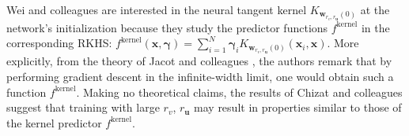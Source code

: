 \documentclass{article}
\begin{document}
Wei and colleagues are interested in the neural tangent kernel $K_{\boldsymbol{w}_{r_v, r_{\boldsymbol{u}}}(0)}$ at the network's initialization because they study the predictor functions $f^{\text{kernel}}$ in the corresponding RKHS: $f^{\text{kernel}}(\boldsymbol{x}, \boldsymbol{\gamma}) = \sum_{i=1}^N \boldsymbol{\gamma}_i K_{\boldsymbol{w}_{r_v, r_{\boldsymbol{u}}}(0)}(\boldsymbol{x}_i, \boldsymbol{x})$. More explicitly, from the theory of Jacot and colleagues \cite{jacot2018neural}, the authors remark that by performing gradient descent in the infinite-width limit, one would obtain such a function $f^{\text{kernel}}$. Making no theoretical claims, the results of Chizat and colleagues \cite{chizat2018lazy} suggest that training with large $r_v$, $r_{\boldsymbol{u}}$ may result in properties similar to those of the kernel predictor $f^{\text{kernel}}$.
\end{document}
